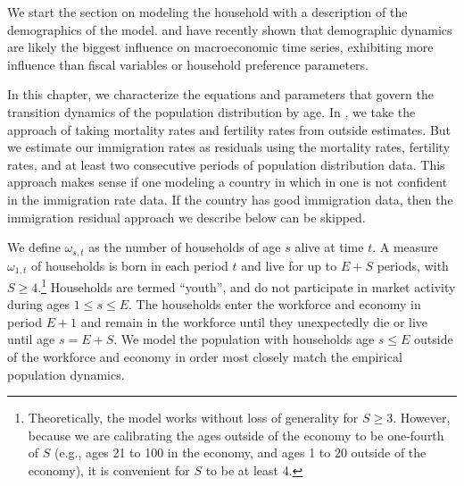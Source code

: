 
We start the \ogindia section on modeling the household with a description of the demographics of the model. \citet{Nishiyama:2015} and \citet{DeBackerEtAl:2017} have recently shown that demographic dynamics are likely the biggest influence on macroeconomic time series, exhibiting more influence than fiscal variables or household preference parameters.

In this chapter, we characterize the equations and parameters that govern the transition dynamics of the population distribution by age. In \ogindia, we take the approach of taking mortality rates and fertility rates from outside estimates. But we estimate our immigration rates as residuals using the mortality rates, fertility rates, and at least two consecutive periods of population distribution data. This approach makes sense if one modeling a country in which in one is not confident in the immigration rate data. If the country has good immigration data, then the immigration residual approach we describe below can be skipped.

We define $\omega_{s,t}$ as the number of households of age $s$ alive at time $t$. A measure $\omega_{1,t}$ of households is born in each period $t$ and live for up to $E+S$ periods, with $S\geq 4$.\footnote{Theoretically, the model works without loss of generality for $S\geq 3$. However, because we are calibrating the ages outside of the economy to be one-fourth of $S$ (e.g., ages 21 to 100 in the economy, and ages 1 to 20 outside of the economy), it is convenient for $S$ to be at least 4.} Households are termed ``youth'', and do not participate in market activity during ages $1\leq s\leq E$. The households enter the workforce and economy in period $E+1$ and remain in the workforce until they unexpectedly die or live until age $s=E+S$. We model the population with households age $s\leq E$ outside of the workforce and economy in order most closely match the empirical population dynamics.

